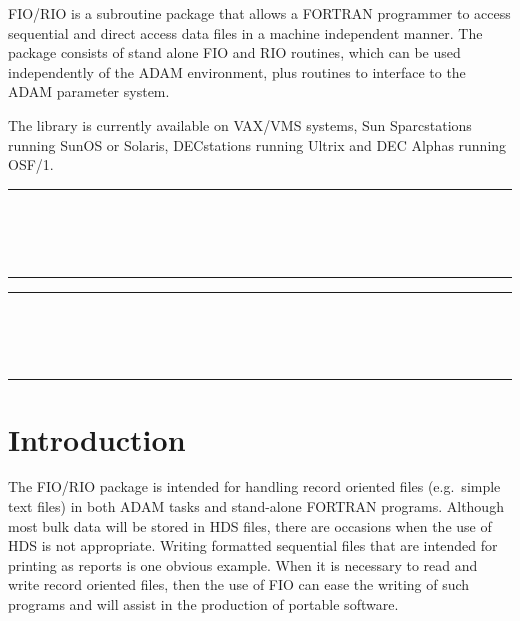FIO/RIO is a subroutine package that allows a FORTRAN programmer to access
sequential and direct access data files in a machine independent manner. The
package consists of stand alone FIO and RIO routines, which can be used
independently of the ADAM environment, plus routines to interface to the ADAM
parameter system.

The library is currently available on VAX/VMS systems, Sun Sparcstations
running SunOS or Solaris, DECstations running Ultrix and DEC Alphas running
OSF/1.

\markright{\stardocname}
\newpage
\markright{\stardocname}

\null\vspace {5mm}
\begin {center}
\rule{80mm}{0.5mm} \\ [1ex]
{\Large\bf \stardoctitle \\ [2.5ex]
           \stardocversion} \\ [2ex]
\rule{80mm}{0.5mm}
\end{center}
\vspace{30mm}

\setlength{\parskip}{0mm}
\tableofcontents
\setlength{\parskip}{\medskipamount}
\markright{\stardocname}
\newpage
\renewcommand{\thepage}{\arabic{page}}
\setcounter{page}{1}

\null\vspace {5mm}
\begin {center}
\rule{80mm}{0.5mm} \\ [1ex]
{\Large\bf \stardoctitle \\ [2.5ex]
           \stardocversion} \\ [2ex]
\rule{80mm}{0.5mm}
\end{center}
\vspace{30mm}


\section{Introduction}

The FIO/RIO package is intended for handling record oriented files (e.g.\
simple text files) in both ADAM tasks and stand-alone FORTRAN programs.
Although most bulk data will be stored in HDS files, there are occasions when
the use of HDS is not appropriate. Writing formatted sequential files that are
intended for printing as reports is one obvious example. When it is necessary
to read and write record oriented files, then the use of FIO can ease the
writing of such programs and will assist in the production of portable
software.

